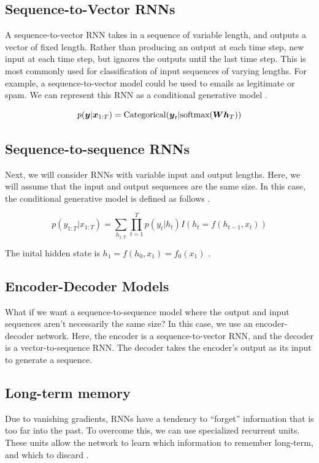 \documentclass{article}
\begin{document}
\subsection{Sequence-to-Vector RNNs}

A sequence-to-vector RNN takes in a sequence of variable length, and outputs a vector of fixed length. Rather than producing an output at each time step,  new input at each time step, but ignores the outputs until the last time step. This is most commonly used for classification of input sequences of varying lengths. For example, a sequence-to-vector model could be used to emails as legitimate or spam. We can represent this RNN as a conditional generative model \cite{pml1book}. 

\[p(\vb*{y}|\vb*{x}_{1:T}) = \text{Categorical}(\vb*{y}_t|\text{softmax}(\vb*{W}\vb*{h}_T))\]

\subsection{Sequence-to-sequence RNNs}

Next, we will consider RNNs with variable input and output lengths. Here, we will assume that the input and output sequences are the same size. In this case, the conditional generative model is defined as follows \cite{pml1book}.

\[p(y_{1:T}|x_{1:T}) = \sum_{h_{1:T}}\prod^T_{t=1}p(y_t|h_t)I(h_t=f(h_{t-1},x_t))\]

The inital hidden state is \(h_1 = f(h_0, x_1) = f_0(x_1)\) \cite{pml1book}. 


\subsection{Encoder-Decoder Models}

What if we want a sequence-to-sequence model where the output and input sequences aren't necessarily the same size? In this case, we use an encoder-decoder network. Here, the encoder is a sequence-to-vector RNN, and the decoder is a vector-to-sequence RNN. The decoder takes the encoder's output as its input to generate a sequence.

\subsection{Long-term memory}

Due to vanishing gradients, RNNs have a tendency to ``forget'' information that is too far into the past. To overcome this, we can use specialized recurrent units. These units allow the network to learn which information to remember long-term, and which to discard \cite{hands-on-ml}.
\end{document}
